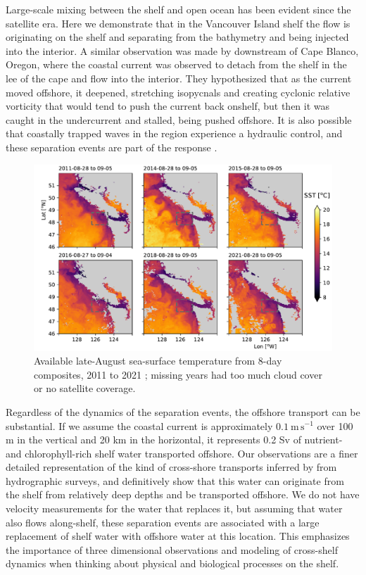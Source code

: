 \documentclass[draft]{agujournal2019}
\begin{document}
Large-scale mixing between the shelf and open ocean has been evident since the satellite era.  Here we demonstrate that in the Vancouver Island shelf the flow is originating on the shelf and separating from the bathymetry and being injected into the interior.  A  similar observation was made by  downstream of Cape Blanco, Oregon, where the coastal current was observed to detach from the shelf in the lee of the cape and flow into the interior.  They hypothesized that as the current moved offshore, it deepened, stretching isopycnals and creating cyclonic relative vorticity that would tend to push the current back onshelf, but then it was caught in the undercurrent and stalled, being pushed offshore. It is also possible that coastally trapped waves in the region experience a hydraulic control, and these separation events are part of the response \cite{dalebarth01}.

\begin{figure}[htbp]
  \begin{center}
    \includegraphics[width=6in]{SSTLateAug}
    \caption{
      Available late-August sea-surface temperature from 8-day composites, 2011 to 2021 \cite{MODISSST8d}; missing years had too much cloud cover or no satellite coverage.  \label{fig:SSTLateAug} }
  \end{center}
\end{figure}

Regardless of the dynamics of the separation events, the offshore transport can be substantial.  If we assume the coastal current is approximately $0.1\ \mathrm{m\,s^{-1}}$ over 100 m in the vertical and 20 km in the horizontal, it represents 0.2 Sv of nutrient- and chlorophyll-rich shelf water transported offshore.  Our observations are a finer detailed representation of the kind of cross-shore transports inferred by  from hydrographic surveys, and definitively show that this water can originate from the shelf from relatively deep depths and be transported offshore.  We do not have velocity measurements for the water that replaces it, but assuming that water also flows along-shelf, these separation events are associated with a large replacement of shelf water with offshore water at this location.  This emphasizes the importance of three dimensional observations and modeling of cross-shelf dynamics when thinking about physical and biological processes on the shelf.
\end{document}
